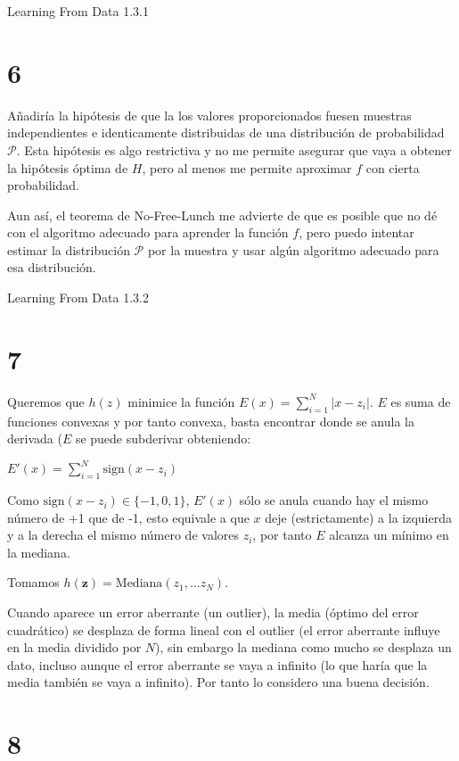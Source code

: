 \documentclass{article}
\begin{document}
Learning From Data 1.3.1

\section{6}

Añadiría la hipótesis de que la los valores proporcionados fuesen
muestras independientes e identicamente distribuidas de una
distribución de probabilidad \(\mathcal{P}\). Esta hipótesis es algo
restrictiva y no me permite asegurar que vaya a obtener la hipótesis
óptima de \(H\), pero al menos me permite aproximar \(f\) con cierta
probabilidad.

Aun así, el teorema de No-Free-Lunch me advierte de que es posible que
no dé con el algoritmo adecuado para aprender la función \(f\), pero
puedo intentar estimar la distribución \(\mathcal{P}\) por la muestra
y usar algún algoritmo adecuado para esa distribución.


Learning From Data 1.3.2

\section{7}

Queremos que \(h(z)\) minimice la función
\(E(x)=\sum_{i=1}^N|x-z_i|\).  \(E\) es suma de funciones convexas y
por tanto convexa, basta encontrar donde se anula la derivada (\(E\)
se puede subderivar obteniendo:

\(E'(x)=\sum_{i=1}^N \mbox{sign}(x-z_i)\)

Como \(\mbox{sign}(x-z_i)\in\{-1,0,1\}\), \(E'(x)\) sólo se anula
cuando hay el mismo número de +1 que de -1, esto equivale a que \(x\)
deje (estrictamente) a la izquierda y a la derecha el mismo número de
valores \(z_i\), por tanto \(E\) alcanza un mínimo en la mediana.

Tomamos \(h(\textbf{z})=\mbox{Mediana}(z_1,\ldots z_N)\).

Cuando aparece un error aberrante (un outlier), la media (óptimo del
error cuadrático) se desplaza de forma lineal con el outlier (el error
aberrante influye en la media dividido por \(N\)), sin embargo la
mediana como mucho se desplaza un dato, incluso aunque el error
aberrante se vaya a infinito (lo que haría que la media también
se vaya a infinito). Por tanto lo considero una buena decisión.

\section{8}
\end{document}
